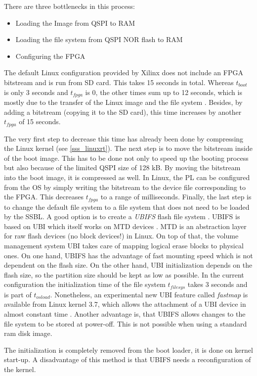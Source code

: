 There are three bottlenecks in this process:
\begin{itemize}
	\item Loading the Image from \ac{QSPI} to \ac{RAM}
	\item Loading the file system from \ac{QSPI} NOR flash to \ac{RAM}
	\item Configuring the \ac{FPGA}
\end{itemize}

The default Linux configuration provided by Xilinx does not include an \ac{FPGA} bitstream and is run from \ac{SD} card.
This takes 15 seconds in total.
Whereas $t_{boot}$ is only 3 seconds and $t_{fpga}$ is 0, the other times sum up to 12 seconds, which is mostly due to the transfer of the Linux image and the file system . 
Besides, by adding a bitstream (copying it to the \ac{SD} card), this time increases by another $ t_{fpga} $ of 15 seconds.   
\par
The very first step to decrease this time has already been done by compressing the Linux kernel (see \ref{sss_linuxrt}).
The next step is to move the bitstream inside of the boot image.
This has to be done not only to speed up the booting process but also because of the limited \ac{QSPI} size of 128 kB.
By moving the bitstream into the boot image, it is compressed as well. 
In Linux, the \ac{PL} can be configured from the \ac{OS} by simply writing the bitstream to the device file corresponding to the \ac{FPGA}. 
This decreases $t_{fpga}$ to a range of milliseconds. 
Finally, the last step is to change the default file system to a file system that does not need to be loaded by the \ac{SSBL}.
A good option is to create a \textit{\ac{UBIFS}} flash file system \cite{ubifs}.
\ac{UBIFS} is based on \ac{UBI} which itself works on \ac{MTD} devices \cite{mtd}.
\ac{MTD} is an abstraction layer for raw flash devices (no block devices!) in Linux.
On top of that, the volume management system \ac{UBI} takes care of mapping logical erase blocks to physical ones.  
On one hand, \ac{UBIFS} has the advantage of fast mounting speed which is not dependent on the flash size.
On the other hand, \ac{UBI} initialization depends on the flash size, so the partition size should be kept as low as possible.
In the current configuration the initialization time of the file system $t_{filesys}$ takes 3 seconds and is part of $t_{osload}$.
Nonetheless, an experimental new \ac{UBI} feature called \textit{fastmap} is available from Linux kernel 3.7, which allows the attachment of a \ac{UBI} device in almost constant time \cite{ubi}.
Another advantage is, that \ac{UBIFS} allows changes to the file system to be stored at power-off.
This is not possible when using a standard ram disk image.
\par
The initialization is completely removed from the boot loader, it is done on kernel start-up.
A disadvantage of this method is that \ac{UBIFS} needs a reconfiguration of the kernel. 


